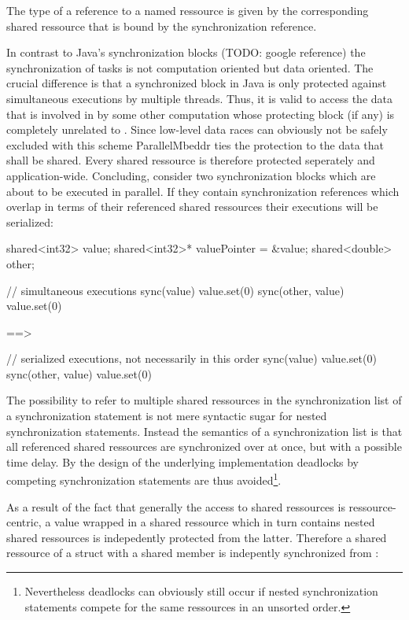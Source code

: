 The type of a reference to a named ressource is given by the corresponding shared ressource that is bound by the  synchronization reference.

In contrast to Java's synchronization blocks (TODO: google reference) the synchronization of tasks is not computation oriented but data oriented. The crucial difference is that a synchronized block  in Java is only protected against simultaneous executions by multiple threads. Thus, it is valid to access the data that is involved in  by some other computation whose protecting block (if any) is completely unrelated to . Since low-level data races can obviously not be safely excluded with this scheme ParallelMbeddr ties the protection to the data that shall be shared. Every shared ressource is therefore protected seperately and application-wide. Concluding, consider two synchronization blocks which are about to be executed in parallel. If they contain synchronization references which overlap in terms of their referenced shared ressources their executions will be serialized:

\begin{ccode}
shared<int32> value;
shared<int32>* valuePointer = &value;
shared<double> other;

// simultaneous executions 
sync(value) { value.set(0) }        sync(other, value) { value.set(0) }
\end{ccode}
==>
\begin{ccode}
// serialized executions, not necessarily in this order
sync(value) { value.set(0) }
sync(other, value) { value.set(0) }
\end{ccode}

The possibility to refer to multiple shared ressources in the synchronization list of a synchronization statement is not mere syntactic sugar for nested synchronization statements. Instead the semantics of a synchronization list is that all referenced shared ressources are synchronized over at once, but with a possible time delay. By the design of the underlying implementation deadlocks by competing synchronization statements are thus avoided\footnote{Nevertheless deadlocks can obviously still occur if nested synchronization statements compete for the same ressources in an unsorted order.}.

As a result of the fact that generally the access to shared ressources is ressource-centric, a value wrapped in a shared ressource which in turn contains nested shared ressources is indepedently protected from the latter. Therefore a shared ressource of a struct with a shared member  is indepently synchronized from :

